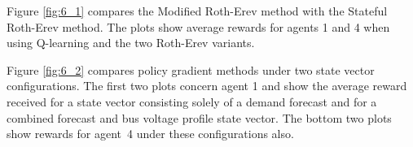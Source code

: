 Figure \ref{fig:6_1} compares the Modified Roth-Erev method with the Stateful
Roth-Erev method.  The plots show average rewards for agents 1 and 4 when
using Q-learning and the two Roth-Erev variants.


Figure \ref{fig:6_2} compares policy gradient methods under two state vector
configurations.  The first two plots concern agent 1 and show the average
reward received for a state vector consisting solely of a demand forecast and
for a combined forecast and bus voltage profile state vector.  The bottom two
plots show rewards for agent~4 under these configurations also.

